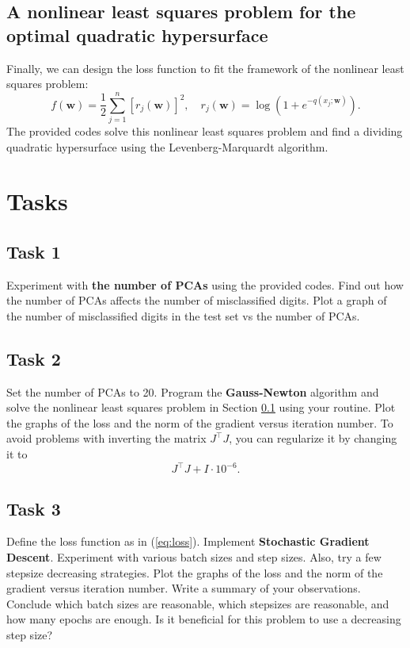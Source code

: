 \documentclass{../kin_math}
\begin{document}
\subsection{A nonlinear least squares problem for the optimal quadratic hypersurface} \label{least_squares}
Finally, we can design the loss function to fit the framework of the nonlinear least squares problem:
\begin{equation}
  f(\textbf{w}) = \frac{1}{2} \sum_{j = 1}^n [r_j(\textbf{w})]^2, \quad r_j(\textbf{w}) = \log\left(1 + e^{-q(x_j; \textbf{w})}\right).
\end{equation}
The provided codes solve this nonlinear least squares problem and find a dividing quadratic hypersurface using the Levenberg-Marquardt algorithm.
\section{Tasks}
\subsection{Task 1}
Experiment with \textbf{the number of PCAs} using the provided codes. Find out how the number of PCAs affects the number of misclassified digits. Plot a graph of the number of misclassified digits in the test set vs the number of PCAs.
\subsection{Task 2}
Set the number of PCAs to 20. Program the \textbf{Gauss-Newton} algorithm and solve the nonlinear least squares problem in Section \ref{least_squares} using your routine. Plot the graphs of the loss and the norm of the gradient versus iteration number. To avoid problems with inverting the matrix $J^\top J$, you can regularize it by changing it to
\begin{equation*}
  J^\top J + I \cdot 10^{-6}.
\end{equation*}
\subsection{Task 3}
Define the loss function as in (\ref{eq:loss}). Implement \textbf{Stochastic Gradient Descent}. Experiment with various batch sizes and step sizes. Also, try a few stepsize decreasing strategies. Plot the graphs of the loss and the norm of the gradient versus iteration number. Write a summary of your observations. Conclude which batch sizes are reasonable, which stepsizes are reasonable, and how many epochs are enough. Is it beneficial for this problem to use a decreasing step size?
\end{document}
